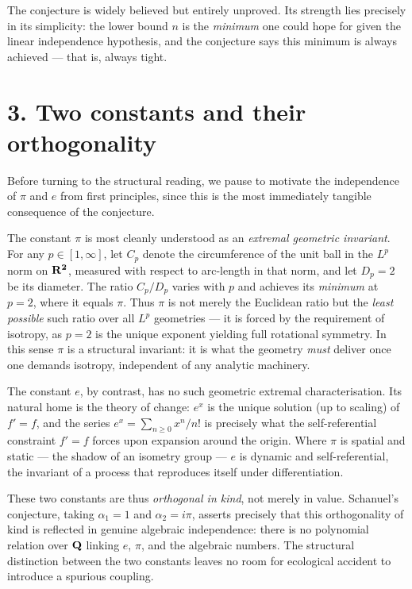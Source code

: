 
The conjecture is widely believed but entirely unproved. Its strength lies
precisely in its simplicity: the lower bound $n$ is the {\it minimum} one could
hope for given the linear independence hypothesis, and the conjecture says this
minimum is always achieved --- that is, always tight.

\section{3. Two constants and their orthogonality}

Before turning to the structural reading, we pause to motivate the independence
of $\pi$ and $e$ from first principles, since this is the most immediately
tangible consequence of the conjecture.

The constant $\pi$ is most cleanly understood as an {\it extremal geometric
invariant}. For any $p \in [1, \infty]$, let $C_p$ denote the circumference of
the unit ball in the $L^p$ norm on $\bf R^2$, measured with respect to
arc-length in that norm, and let $D_p = 2$ be its diameter. The ratio
$C_p/D_p$ varies with $p$ and achieves its {\it minimum} at $p = 2$, where it
equals $\pi$. Thus $\pi$ is not merely the Euclidean ratio but the {\it least
possible} such ratio over all $L^p$ geometries --- it is forced by the
requirement of isotropy, as $p = 2$ is the unique exponent yielding full
rotational symmetry. In this sense $\pi$ is a structural invariant: it is what
the geometry {\it must} deliver once one demands isotropy, independent of any
analytic machinery.


The constant $e$, by contrast, has no such geometric extremal characterisation.
Its natural home is the theory of change: $e^x$ is the unique solution (up to
scaling) of $f' = f$, and the series $e^x = \sum_{n \geq 0} x^n / n!$ is
precisely what the self-referential constraint $f' = f$ forces upon expansion
around the origin. Where $\pi$ is spatial and static --- the shadow of an
isometry group --- $e$ is dynamic and self-referential, the invariant of a
process that reproduces itself under differentiation.

These two constants are thus {\it orthogonal in kind}, not merely in value.
Schanuel's conjecture, taking $\alpha_1 = 1$ and $\alpha_2 = i\pi$, asserts
precisely that this orthogonality of kind is reflected in genuine algebraic
independence: there is no polynomial relation over ${\bf Q}$ linking $e$, $\pi$, and
the algebraic numbers. The structural distinction between the two constants
leaves no room for ecological accident to introduce a spurious coupling.

